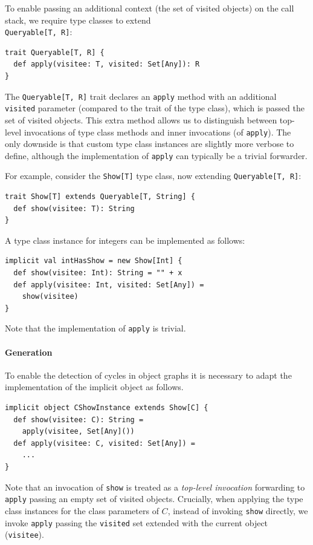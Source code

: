 \documentclass[preprint,nocopyrightspace]{sigplanconf}
\begin{document}
To enable passing an additional context (the set of visited objects) on the call stack,
we require type classes to extend \\\verb|Queryable[T, R]|:

\begin{lstlisting}
trait Queryable[T, R] {
  def apply(visitee: T, visited: Set[Any]): R
}
\end{lstlisting}
\noindent
The \verb|Queryable[T, R]| trait declares an \verb|apply| method with an
additional \verb|visited| parameter (compared to the trait of the type class),
which is passed the set of visited objects. This extra method allows us to
distinguish between top-level invocations of type class methods and inner
invocations (of \verb|apply|). The only downside is that custom type class
instances are slightly more verbose to define, although the implementation of
\verb|apply| can typically be a trivial forwarder.

For example, consider the \verb|Show[T]| type class, now extending
\verb|Queryable[T, R]|:
\begin{lstlisting}
trait Show[T] extends Queryable[T, String] {
  def show(visitee: T): String
}
\end{lstlisting}
\noindent
A type class instance for integers can be implemented as follows:
\begin{lstlisting}
implicit val intHasShow = new Show[Int] {
  def show(visitee: Int): String = "" + x
  def apply(visitee: Int, visited: Set[Any]) =
    show(visitee)
}
\end{lstlisting}
\noindent
Note that the implementation of \verb|apply| is trivial.

\paragraph{Generation}

To enable the detection of cycles in object graphs it is necessary to
adapt the implementation of the implicit object as follows.

\begin{lstlisting}
implicit object CShowInstance extends Show[C] {
  def show(visitee: C): String =
    apply(visitee, Set[Any]())
  def apply(visitee: C, visited: Set[Any]) =
    ...
}
\end{lstlisting}
\noindent
Note that an invocation of \verb|show| is treated as a \emph{top-level
invocation} forwarding to \verb|apply| passing an empty set of visited
objects. Crucially, when applying the type class instances for the class
parameters of $C$, instead of invoking \verb|show| directly, we invoke
\verb|apply| passing the \verb|visited| set extended with the current object
(\verb|visitee|).
\end{document}
